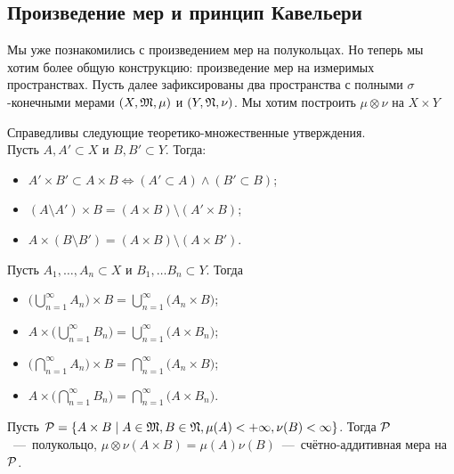 \subsection{Произведение мер и принцип Кавельери}
Мы уже познакомились с произведением мер на полукольцах. Но теперь мы хотим более общую конструкцию: произведение мер на измеримых пространствах. Пусть далее зафиксированы два пространства с полными $\sigma$-конечными мерами $(X, \mathfrak{M}, \mu)$ и $(Y, \mathfrak{N}, \nu)$. Мы хотим построить $\mu\otimes\nu$ на $X\times Y$
\begin{fact}
    Справедливы следующие теоретико-множественные утверждения. \\ Пусть $A, A' \subset X$ и $B, B' \subset Y$. Тогда:
    \begin{itemize}
        \item $A'\times B' \subset A \times B \Longleftrightarrow (A' \subset A) \wedge (B' \subset B)$;
        \item $(A \setminus A') \times B = (A \times B) \setminus (A' \times B)$;
        \item $A \times (B \setminus B') = (A \times B) \setminus (A \times B')$.
    \end{itemize}
    Пусть $A_1, \ldots, A_n \subset X$ и $B_1, \ldots B_n \subset Y$. Тогда 
    \begin{itemize}
        \item $\biggl(\bigcup\limits_{n = 1}^\infty A_n \biggr) \times B = \bigcup\limits_{n = 1}^\infty \biggl(A_n \times B\biggr)$;
        \item $A \times \biggl(\bigcup\limits_{n = 1}^\infty B_n \biggr) = \bigcup\limits_{n = 1}^\infty \biggl(A \times B_n\biggr)$;
        \item $\biggl(\bigcap\limits_{n = 1}^\infty A_n \biggr) \times B = \bigcap\limits_{n = 1}^\infty \biggl(A_n \times B\biggr)$;
        \item $A \times \biggl(\bigcap\limits_{n = 1}^\infty B_n \biggr) = \bigcap\limits_{n = 1}^\infty \biggl(A \times B_n\biggr)$.
    \end{itemize}
\end{fact}
\begin{lemma}
    Пусть $\mathcal{P} = \{A \times B \mid A \in \mathfrak{M}, B \in \mathfrak{N}, \mu(A) < +\infty, \nu(B) < \infty\}$. Тогда
    $\mathcal{P}$~---~полукольцо, $\mu\otimes\nu(A \times B) = \mu(A)\nu(B)$~---~счётно-аддитивная мера на $\mathcal{P}$.
\end{lemma}
